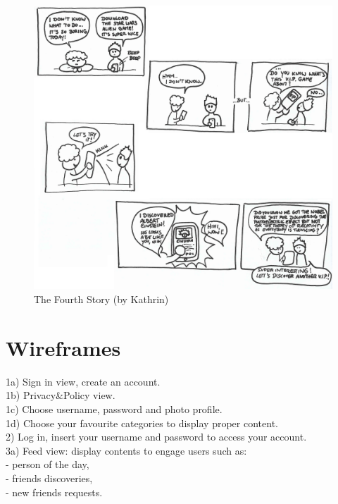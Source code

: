 \documentclass[12pt]{scrartcl}
\begin{document}
	\begin{figure}[H]
        		\centering
       		\includegraphics[width=\textwidth]{../images/story4.jpg}
       		\caption{The Fourth Story (by Kathrin)}
        		\label{story4}
	\end{figure}
	

\section{Wireframes}


	1a) Sign in view, create an account.\\
	1b) Privacy\&Policy view.\\
	1c) Choose username, password and photo profile.\\
	1d) Choose your favourite categories to display proper content.\\

	2) Log in, insert your username and password to access your account.\\

	3a) Feed view: display contents to engage users such as:\\
		- person of the day,\\
		- friends discoveries,\\
		- new friends requests.\\
\end{document}
